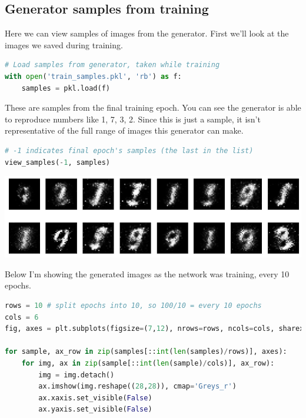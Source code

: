 \subsection{Generator samples from
training}

Here we can view samples of images from the generator. First we'll look
at the images we saved during training.

\begin{lstlisting}[language=Python]
# Load samples from generator, taken while training
with open('train_samples.pkl', 'rb') as f:
    samples = pkl.load(f)
\end{lstlisting}

These are samples from the final training epoch. You can see the
generator is able to reproduce numbers like 1, 7, 3, 2. Since this is
just a sample, it isn't representative of the full range of images this
generator can make.

\begin{lstlisting}[language=Python]
# -1 indicates final epoch's samples (the last in the list)
view_samples(-1, samples)
\end{lstlisting}

\includegraphics{img/genAdvNet/gan/output_30_0.png}

Below I'm showing the generated images as the network was training,
every 10 epochs.

\begin{lstlisting}[language=Python]
rows = 10 # split epochs into 10, so 100/10 = every 10 epochs
cols = 6
fig, axes = plt.subplots(figsize=(7,12), nrows=rows, ncols=cols, sharex=True, sharey=True)

for sample, ax_row in zip(samples[::int(len(samples)/rows)], axes):
    for img, ax in zip(sample[::int(len(sample)/cols)], ax_row):
        img = img.detach()
        ax.imshow(img.reshape((28,28)), cmap='Greys_r')
        ax.xaxis.set_visible(False)
        ax.yaxis.set_visible(False)
\end{lstlisting}

